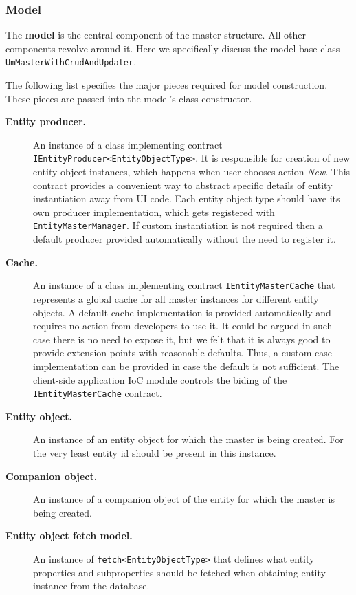   \subsubsection{Model}
  
  The \textbf{model} is the central component of the master structure. 
  All other components revolve around it.  
  Here we specifically discuss the model base class \texttt{UmMasterWithCrudAndUpdater}.
  
  The following list specifies the major pieces required for model construction.
  These pieces are passed into the model's class constructor.
  \begin{description}
   \item[\textbf{Entity producer.}] An instance of a class implementing contract \texttt{IEntityProducer<EntityObjectType>}.
   It is responsible for creation of new entity object instances, which happens when user chooses action \emph{New}.
   This contract provides a convenient way to abstract specific details of entity instantiation away from UI code.
   Each entity object type should have its own producer implementation, which gets registered with \texttt{EntityMasterManager}.
   If custom instantiation is not required then a default producer provided automatically without the need to register it.
   \item[\textbf{Cache.}] An instance of a class implementing contract \texttt{IEntityMasterCache} that represents a global cache for all master instances for different entity objects.
   A default cache implementation is provided automatically and requires no action from developers to use it.
   It could be argued in such case there is no need to expose it, but we felt that it is always good to provide extension points with reasonable defaults.
   Thus, a custom case implementation can be provided in case the default is not sufficient.
   The client-side application IoC module controls the biding of the \texttt{IEntityMasterCache} contract.
   \item[\textbf{Entity object.}] An instance of an entity object for which the master is being created.
   For the very least entity id should be present in this instance.
   \item[\textbf{Companion object.}] An instance of a companion object of the entity for which the master is being created.   
   \item[\textbf{Entity object fetch model.}] An instance of \texttt{fetch<EntityObjectType>} that defines what entity properties and subproperties should be fetched when obtaining entity instance from the database.

\end{description}
